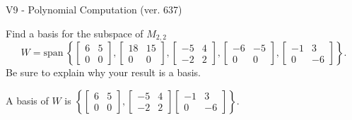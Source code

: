 \begin{exercise}
  \begin{exerciseTitle}V9 - Polynomial Computation (ver. 637)\end{exerciseTitle}
  \begin{exerciseStatement}
    Find a basis for the subspace of \(M_{2,2}\) 
\[W=\mathrm{span}\ \left\{\left[\begin{array}{cc}
6 & 5 \\
0 & 0
\end{array}\right] , \left[\begin{array}{cc}
18 & 15 \\
0 & 0
\end{array}\right] , \left[\begin{array}{cc}
-5 & 4 \\
-2 & 2
\end{array}\right] , \left[\begin{array}{cc}
-6 & -5 \\
0 & 0
\end{array}\right] , \left[\begin{array}{cc}
-1 & 3 \\
0 & -6
\end{array}\right]\right\}.\]
 Be sure to explain why your result is a basis.


  \end{exerciseStatement}
  \begin{exerciseAnswer}
   A basis of \(W\) is  \(\left\{\left[\begin{array}{cc}
6 & 5 \\
0 & 0
\end{array}\right] , \left[\begin{array}{cc}
-5 & 4 \\
-2 & 2
\end{array}\right] \left[\begin{array}{cc}
-1 & 3 \\
0 & -6
\end{array}\right]\right\}\).
  


  \end{exerciseAnswer}
\end{exercise}